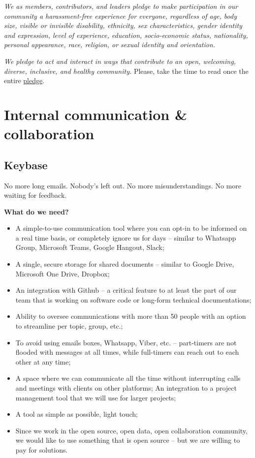 \documentclass[
  a4paper,
  openany, a4paper, oneside]{book}
\begin{document}
\emph{We as members, contributors, and leaders pledge to make participation in our community a harassment-free experience for everyone, regardless of age, body size, visible or invisible disability, ethnicity, sex characteristics, gender identity and expression, level of experience, education, socio-economic status, nationality, personal appearance, race, religion, or sexual identity and orientation.}

\emph{We pledge to act and interact in ways that contribute to an open, welcoming, diverse, inclusive, and healthy community.} Please, take the time to read once the entire \href{https://www.contributor-covenant.org/version/2/0/code_of_conduct/}{pledge}.

\hypertarget{internal-communication-collaboration}{%
\section{Internal communication \& collaboration}\label{internal-communication-collaboration}}

\hypertarget{keybase}{%
\subsection{Keybase}\label{keybase}}

No more long emails. Nobody's left out. No more misunderstandings. No more waiting for feedback.

\textbf{What do we need?}

\begin{itemize}
\item
  A simple-to-use communication tool where you can opt-in to be informed on a real time basis, or completely ignore us for days -- similar to Whatsapp Group, Microsoft Teams, Google Hangout, Slack;
\item
  A single, secure storage for shared documents -- similar to Google Drive, Microsoft One Drive, Dropbox;
\item
  An integration with Github -- a critical feature to at least the part of our team that is working on software code or long-form technical documentations;
\item
  Ability to oversee communications with more than 50 people with an option to streamline per topic, group, etc.;
\item
  To avoid using emails boxes, Whatsapp, Viber, etc. -- part-timers are not flooded with messages at all times, while full-timers can reach out to each other at any time;
\item
  A space where we can communicate all the time without interrupting calls and meetings with clients on other platforms;
  An integration to a project management tool that we will use for larger projects;
\item
  A tool as simple as possible, light touch;
\item
  Since we work in the open source, open data, open collaboration community, we would like to use something that is open source -- but we are willing to pay for solutions.
\end{itemize}
\end{document}
